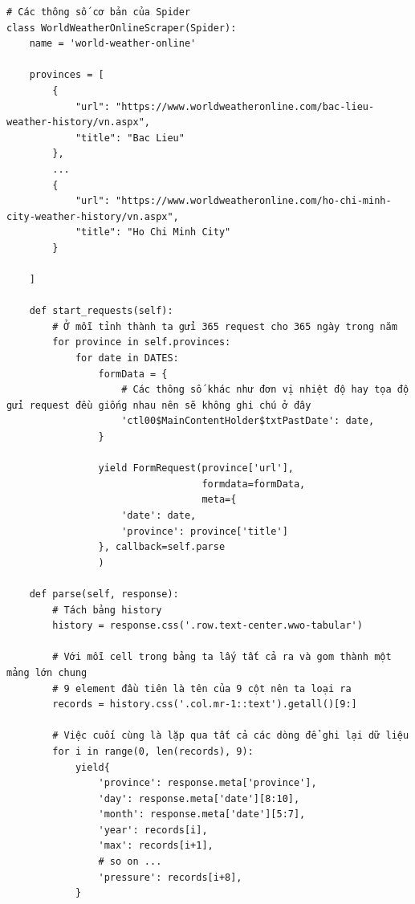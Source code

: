 \documentclass{article}
\begin{document}
\begin{verbatim}
# Các thông số cơ bản của Spider
class WorldWeatherOnlineScraper(Spider):
    name = 'world-weather-online'

    provinces = [
        {
			"url": "https://www.worldweatheronline.com/bac-lieu-weather-history/vn.aspx",
			"title": "Bac Lieu"
		},
		...
		{
			"url": "https://www.worldweatheronline.com/ho-chi-minh-city-weather-history/vn.aspx",
			"title": "Ho Chi Minh City"
		}

    ]

	def start_requests(self):
		# Ở mỗi tỉnh thành ta gửi 365 request cho 365 ngày trong năm
        for province in self.provinces:
            for date in DATES:
                formData = {
					# Các thông số khác như đơn vị nhiệt độ hay tọa độ gửi request đều giống nhau nên sẽ không ghi chú ở đây
                    'ctl00$MainContentHolder$txtPastDate': date,
                }

                yield FormRequest(province['url'],
                                  formdata=formData,
                                  meta={
                    'date': date,
                    'province': province['title']
                }, callback=self.parse
                )

	def parse(self, response):
		# Tách bảng history
        history = response.css('.row.text-center.wwo-tabular')

		# Với mỗi cell trong bảng ta lấy tất cả ra và gom thành một mảng lớn chung
        # 9 element đầu tiên là tên của 9 cột nên ta loại ra
        records = history.css('.col.mr-1::text').getall()[9:]

		# Việc cuối cùng là lặp qua tất cả các dòng để ghi lại dữ liệu
        for i in range(0, len(records), 9):
            yield{
                'province': response.meta['province'],
                'day': response.meta['date'][8:10],
                'month': response.meta['date'][5:7],
                'year': records[i],
                'max': records[i+1],
				# so on ...
                'pressure': records[i+8],
            }
\end{verbatim}
\end{document}
